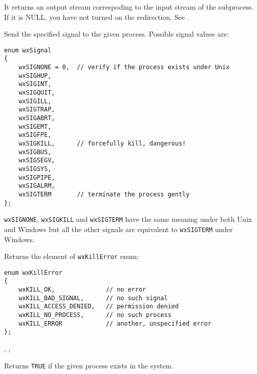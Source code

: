 \label{wxprocessgetoutputstream}


It returns an output stream correspoding to the input stream of the subprocess.
If it is NULL, you have not turned on the redirection.
See .

\label{wxprocesskill}


Send the specified signal to the given process. Possible signal values are:

\begin{verbatim}
enum wxSignal
{
    wxSIGNONE = 0,  // verify if the process exists under Unix
    wxSIGHUP,
    wxSIGINT,
    wxSIGQUIT,
    wxSIGILL,
    wxSIGTRAP,
    wxSIGABRT,
    wxSIGEMT,
    wxSIGFPE,
    wxSIGKILL,      // forcefully kill, dangerous!
    wxSIGBUS,
    wxSIGSEGV,
    wxSIGSYS,
    wxSIGPIPE,
    wxSIGALRM,
    wxSIGTERM       // terminate the process gently
};
\end{verbatim}

{\tt wxSIGNONE}, {\tt wxSIGKILL} and {\tt wxSIGTERM} have the same meaning
under both Unix and Windows but all the other signals are equivalent to 
{\tt wxSIGTERM} under Windows.

Returns the element of {\tt wxKillError} enum:

\begin{verbatim}
enum wxKillError
{
    wxKILL_OK,              // no error
    wxKILL_BAD_SIGNAL,      // no such signal
    wxKILL_ACCESS_DENIED,   // permission denied
    wxKILL_NO_PROCESS,      // no such process
    wxKILL_ERROR            // another, unspecified error
};
\end{verbatim}


,\rtfsp
{},\rtfsp
{}

\label{wxprocessexists}


Returns {\tt TRUE} if the given process exists in the system.


